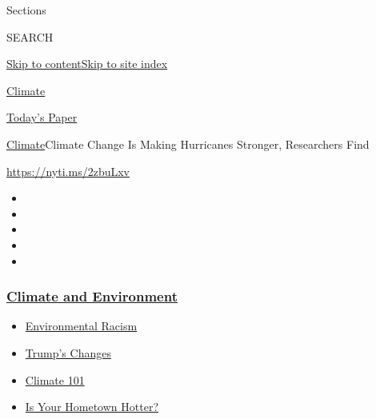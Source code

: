 Sections

SEARCH

\protect\hyperlink{site-content}{Skip to
content}\protect\hyperlink{site-index}{Skip to site index}

\href{https://www.nytimes3xbfgragh.onion/section/climate}{Climate}

\href{https://myaccount.nytimes3xbfgragh.onion/auth/login?response_type=cookie\&client_id=vi}{}

\href{https://www.nytimes3xbfgragh.onion/section/todayspaper}{Today's
Paper}

\href{/section/climate}{Climate}\textbar{}Climate Change Is Making
Hurricanes Stronger, Researchers Find

\url{https://nyti.ms/2zbuLxv}

\begin{itemize}
\item
\item
\item
\item
\item
\end{itemize}

\hypertarget{climate-and-environment}{%
\subsubsection{\texorpdfstring{\href{https://www.nytimes3xbfgragh.onion/section/climate?name=styln-climate\&region=TOP_BANNER\&block=storyline_menu_recirc\&action=click\&pgtype=Article\&impression_id=e62354b0-f2bc-11ea-886d-f70f43d98c6e\&variant=undefined}{Climate
and
Environment}}{Climate and Environment}}\label{climate-and-environment}}

\begin{itemize}
\tightlist
\item
  \href{https://www.nytimes3xbfgragh.onion/interactive/2020/08/24/climate/racism-redlining-cities-global-warming.html?name=styln-climate\&region=TOP_BANNER\&block=storyline_menu_recirc\&action=click\&pgtype=Article\&impression_id=e62354b1-f2bc-11ea-886d-f70f43d98c6e\&variant=undefined}{Environmental
  Racism}
\item
  \href{https://www.nytimes3xbfgragh.onion/interactive/2020/climate/trump-environment-rollbacks.html?name=styln-climate\&region=TOP_BANNER\&block=storyline_menu_recirc\&action=click\&pgtype=Article\&impression_id=e62354b2-f2bc-11ea-886d-f70f43d98c6e\&variant=undefined}{Trump's
  Changes}
\item
  \href{https://www.nytimes3xbfgragh.onion/interactive/2020/04/19/climate/climate-crash-course-1.html?name=styln-climate\&region=TOP_BANNER\&block=storyline_menu_recirc\&action=click\&pgtype=Article\&impression_id=e62354b3-f2bc-11ea-886d-f70f43d98c6e\&variant=undefined}{Climate
  101}
\item
  \href{https://www.nytimes3xbfgragh.onion/interactive/2018/08/30/climate/how-much-hotter-is-your-hometown.html?name=styln-climate\&region=TOP_BANNER\&block=storyline_menu_recirc\&action=click\&pgtype=Article\&impression_id=e62354b4-f2bc-11ea-886d-f70f43d98c6e\&variant=undefined}{Is
  Your Hometown Hotter?}
\end{itemize}

